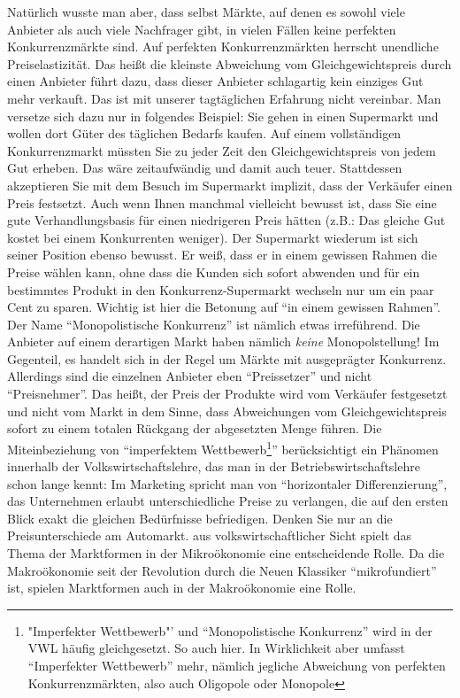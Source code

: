 Natürlich wusste man aber, dass selbst Märkte, auf denen es sowohl viele Anbieter als auch viele Nachfrager gibt, in vielen Fällen keine perfekten Konkurrenzmärkte sind. Auf perfekten Konkurrenzmärkten herrscht unendliche Preiselastizität. Das heißt die kleinste Abweichung vom Gleichgewichtspreis durch einen Anbieter führt dazu, dass dieser Anbieter schlagartig kein einziges Gut mehr verkauft. Das ist mit unserer tagtäglichen Erfahrung nicht vereinbar. Man versetze sich dazu nur in folgendes Beispiel: Sie gehen in einen Supermarkt und wollen dort Güter des täglichen Bedarfs kaufen. Auf einem vollständigen Konkurrenzmarkt müssten Sie zu jeder Zeit den Gleichgewichtspreis von jedem Gut erheben. Das wäre zeitaufwändig und damit auch teuer. Stattdessen akzeptieren Sie mit dem Besuch im Supermarkt implizit, dass der Verkäufer einen Preis festsetzt. Auch wenn Ihnen manchmal vielleicht bewusst ist, dass Sie eine gute Verhandlungsbasis für einen niedrigeren Preis hätten (z.B.: Das gleiche Gut kostet bei einem Konkurrenten weniger). Der Supermarkt wiederum ist sich seiner Position ebenso bewusst. Er weiß, dass er in einem gewissen Rahmen die Preise wählen kann, ohne dass die Kunden sich sofort abwenden und für ein bestimmtes Produkt in den Konkurrenz-Supermarkt wechseln nur um ein paar Cent zu sparen. Wichtig ist hier die Betonung auf "`in einem gewissen Rahmen"'. Der Name "`Monopolistische Konkurrenz"' ist nämlich etwas irreführend. Die Anbieter auf einem derartigen Markt haben nämlich \textit{keine} Monopolstellung! Im Gegenteil, es handelt sich in der Regel um Märkte mit ausgeprägter Konkurrenz. Allerdings sind die einzelnen Anbieter eben "`Preissetzer"' und nicht "`Preisnehmer"'. Das heißt, der Preis der Produkte wird vom Verkäufer festgesetzt und nicht vom Markt in dem Sinne, dass Abweichungen vom Gleichgewichtspreis sofort zu einem totalen Rückgang der abgesetzten Menge führen. Die Miteinbeziehung von "`imperfektem Wettbewerb\footnote{"Imperfekter Wettbewerb"' und "`Monopolistische Konkurrenz"' wird in der VWL häufig gleichgesetzt. So auch hier. In Wirklichkeit aber umfasst "`Imperfekter Wettbewerb"' mehr, nämlich jegliche Abweichung von perfekten Konkurrenzmärkten, also auch Oligopole oder Monopole}"' berücksichtigt ein Phänomen innerhalb der Volkswirtschaftslehre, das man in der Betriebswirtschaftslehre schon lange kennt: Im Marketing spricht man von "`horizontaler Differenzierung"', das Unternehmen erlaubt unterschiedliche Preise zu verlangen, die auf den ersten Blick exakt die gleichen Bedürfnisse befriedigen. Denken Sie nur an die Preisunterschiede am Automarkt. aus volkswirtschaftlicher Sicht spielt das Thema der Marktformen in der Mikroökonomie eine entscheidende Rolle. Da die Makroökonomie seit der Revolution durch die Neuen Klassiker "`mikrofundiert"' ist, spielen Marktformen auch in der Makroökonomie eine Rolle.  
